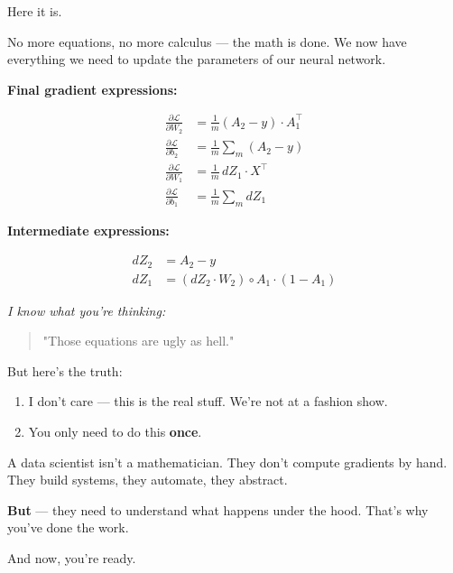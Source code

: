 \documentclass[11pt]{article}
\begin{document}
Here it is.

No more equations, no more calculus — the math is done.  
We now have everything we need to update the parameters of our neural network.

\textbf{Final gradient expressions:}

\begin{resultbox}[title=Final Gradient Equations]
\[
\begin{aligned}
\frac{\partial \mathcal{L}}{\partial W_2} &= \frac{1}{m} (A_2 - y) \cdot A_1^\top \\[0.5em]
\frac{\partial \mathcal{L}}{\partial b_2} &= \frac{1}{m} \sum_m (A_2 - y) \\[0.5em]
\frac{\partial \mathcal{L}}{\partial W_1} &= \frac{1}{m} \, dZ_1 \cdot X^\top \\[0.5em]
\frac{\partial \mathcal{L}}{\partial b_1} &= \frac{1}{m} \sum_m dZ_1
\end{aligned}
\]
\end{resultbox}

\textbf{Intermediate expressions:}

\begin{resultbox}[title=Intermediate Quantities]
\[
\begin{aligned}
dZ_2 &= A_2 - y \\[0.5em]
dZ_1 &= (dZ_2 \cdot W_2) \circ A_1 \cdot (1 - A_1)
\end{aligned}
\]
\end{resultbox}

\textit{I know what you're thinking:}

\begin{quote}
"Those equations are ugly as hell."
\end{quote}

But here’s the truth:

\begin{enumerate}
  \item I don't care — this is the real stuff. We’re not at a fashion show.
  \item You only need to do this \textbf{once}.
\end{enumerate}

A data scientist isn’t a mathematician.  
They don’t compute gradients by hand.  
They build systems, they automate, they abstract.

\textbf{But} — they need to understand what happens under the hood.  
That’s why you’ve done the work.

And now, you’re ready.
\end{document}
